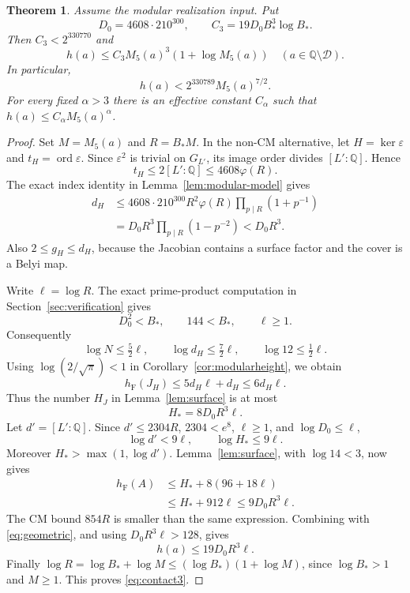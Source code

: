 \documentclass[11pt,a4paper]{article}
\newtheorem{theorem}{Theorem}[section]
\theoremstyle{definition}
\newcommand{\Q}{\mathbb Q}
\newcommand{\hF}{h_{\mathrm F}}
\begin{document}
\begin{theorem}\label{thm:contactheight}
Assume the modular realization input. Put
\[
 D_0=4608\cdot210^{300},\qquad
 C_3=19D_0B_*^3\log B_*.
\]
Then $C_3<2^{330770}$ and
\begin{equation}\label{eq:contact3}
 h(a)\le C_3 M_5(a)^3(1+\log M_5(a))
 \quad(a\in\Q\setminus\mathcal D).
\end{equation}
In particular,
\begin{equation}\label{eq:contact-seven-halves}
 h(a)<2^{330789}M_5(a)^{7/2}.
\end{equation}
For every fixed $\alpha>3$ there is an effective constant
$C_\alpha$ such that $h(a)\le C_\alpha M_5(a)^\alpha$.
\end{theorem}
\begin{proof}
Set $M=M_5(a)$ and $R=B_*M$. In the non-CM alternative, let
$H=\ker\varepsilon$ and $t_H=\operatorname{ord}\varepsilon$.
Since $\varepsilon^2$ is trivial on $G_{L'}$, its image order
divides $[L':\Q]$. Hence
\[
 t_H\le2[L':\Q]\le4608\varphi(R).
\]
The exact index identity in Lemma~\ref{lem:modular-model} gives
\begin{equation}\label{eq:cubic-degree}
 \begin{split}
 d_H
 &\le4608\cdot210^{300}R^2\varphi(R)
                    \prod_{p\mid R}(1+p^{-1})\\
 &=D_0R^3\prod_{p\mid R}(1-p^{-2})<D_0R^3.
 \end{split}
\end{equation}
Also $2\le g_H\le d_H$, because the Jacobian contains a surface
factor and the cover is a Belyi map.

Write $\ell=\log R$. The exact prime-product computation in
Section~\ref{sec:verification} gives
\[
 D_0^2<B_*,\qquad144<B_*,\qquad \ell\ge1.
\]
Consequently
\[
 \log N\le\tfrac52\ell,\qquad
 \log d_H\le\tfrac72\ell,\qquad
 \log12\le\tfrac12\ell.
\]
Using $\log(2/\sqrt\pi)<1$ in
Corollary~\ref{cor:modularheight}, we obtain
\begin{equation}\label{eq:jacobian-numeric}
 \hF(J_H)\le5d_H\ell+d_H\le6d_H\ell.
\end{equation}
Thus the number $H_J$ in Lemma~\ref{lem:surface} is at most
\[
 H_*=8D_0R^3\ell.
\]
Let $d'=[L':\Q]$. Since $d'\le2304R$, $2304<e^8$,
$\ell\ge1$, and $\log D_0\le\ell$,
\[
 \log d'<9\ell,\qquad
 \log H_*\le9\ell.
\]
Moreover $H_*>\max(1,\log d')$.
Lemma~\ref{lem:surface}, with $\log14<3$, now gives
\[
 \begin{split}
 \hF(A)
 &\le H_*+8(96+18\ell)\\
 &\le H_*+912\ell
 \le9D_0R^3\ell.
 \end{split}
\]
The CM bound $854R$ is smaller than the same expression.
Combining with \eqref{eq:geometric}, and using
$D_0R^3\ell>128$, gives
\[
 h(a)\le19D_0R^3\ell.
\]
Finally $\log R=\log B_*+\log M\le
(\log B_*)(1+\log M)$, since $\log B_*>1$ and $M\ge1$.
This proves \eqref{eq:contact3}.


\end{proof}
\end{document}
